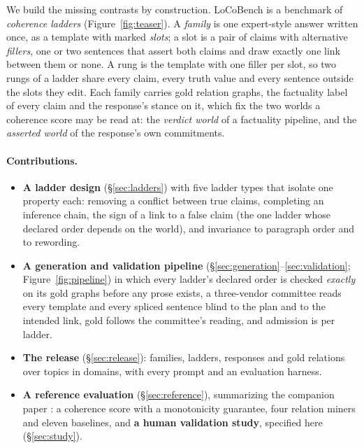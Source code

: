 \documentclass[11pt]{article}
\begin{document}
We build the missing contrasts by construction. LoCoBench is a benchmark of \emph{coherence
ladders} (Figure~\ref{fig:teaser}). A \emph{family} is one expert-style answer written once, as a
template with marked \emph{slots}; a slot is a pair of claims with alternative \emph{fillers},
one or two sentences that assert both claims and draw exactly one link between them or none. A
rung is the template with one filler per slot, so two rungs of a ladder share every claim, every
truth value and every sentence outside the slots they edit. Each family carries gold relation
graphs, the factuality label of every claim and the response's stance on it, which fix the two
worlds a coherence score may be read at: the \emph{verdict world} of a factuality pipeline, and
the \emph{asserted world} of the response's own commitments.

\paragraph{Contributions.}
\begin{itemize}[leftmargin=1.2em,itemsep=1pt,topsep=2pt]
\item \textbf{A ladder design} (\S\ref{sec:ladders}) with five ladder types that isolate one
  property each: removing a conflict between true claims, completing an inference chain, the sign
  of a link to a false claim (the one ladder whose declared order depends on the world), and
  invariance to paragraph order and to rewording.
\item \textbf{A generation and validation pipeline} (\S\ref{sec:generation}--\ref{sec:validation};
  Figure~\ref{fig:pipeline}) in which every ladder's declared order is checked \emph{exactly} on
  its gold graphs before any prose exists, a three-vendor committee reads every template and every
  spliced sentence blind to the plan and to the intended link, gold follows the committee's
  reading, and admission is per ladder.
\item \textbf{The release} (\S\ref{sec:release}): \lbFamilies{} families, \lbLadders{} ladders,
  \lbItems{} responses and \lbRelTotal{} gold relations over \lbTopics{} topics in \lbDomains{}
  domains, with every prompt and an evaluation harness.
\item \textbf{A reference evaluation} (\S\ref{sec:reference}), summarizing the companion paper
  \citep{anoncoherence}: a coherence score with a monotonicity guarantee, four relation miners and
  eleven baselines, and \textbf{a human validation study}, specified here (\S\ref{sec:study}).
\end{itemize}
\end{document}

